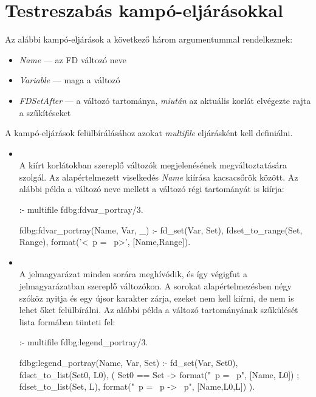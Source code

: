 \section{Testreszabás kampó-eljárásokkal}

Az alábbi kampó-eljárások a következő három argumentummal rendelkeznek:

\begin{itemize}
\item \emph{Name} --- az FD változó neve
\item \emph{Variable} --- maga a változó
\item \emph{FDSetAfter} --- a változó tartománya, \emph{miután} az aktuális
  korlát elvégezte rajta a szűkítéseket
\end{itemize}

A kampó-eljárások felülbírálásához azokat \emph{multifile} eljárásként kell definiálni.

\begin{itemize}
\item {}\\
  A kiírt korlátokban szereplő változók megjelenésének megváltoztatására
  szolgál. Az alapértelmezett viselkedés \textsl{Name} kiírása kacsacsőrök
  között. Az alábbi példa a változó neve mellett a változó régi tartományát is
  kiírja:

\begin{prologcode}
:- multifile fdbg:fdvar_portray/3.

fdbg:fdvar_portray(Name, Var, _) :-
       fd_set(Var, Set), fdset_to_range(Set, Range),
       format('<~p = ~p>', [Name,Range]).
\end{prologcode}

\item {}\\
  A jelmagyarázat minden sorára meghívódik, és így végigfut a jelmagyarázatban
  szereplő változókon. A sorokat alapértelmezésben négy szóköz nyitja és egy
  újsor karakter zárja, ezeket nem kell kiírni, de nem is lehet őket felülbírálni.
  Az alábbi példa a változó tartományának szűkülését lista formában tünteti fel:

\begin{prologcode}
:- multifile fdbg:legend_portray/3.

fdbg:legend_portray(Name, Var, Set) :-
        fd_set(Var, Set0), fdset_to_list(Set0, L0),
        (   Set0 == Set
        ->  format("~p = ~p", [Name, L0])
        ;   fdset_to_list(Set, L),
            format("~p = ~p -> ~p", [Name,L0,L])
        ).
\end{prologcode}
\end{itemize}

